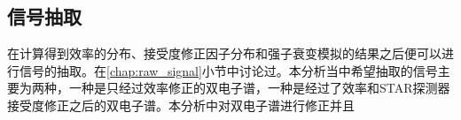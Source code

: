 \subsection{信号抽取}

在计算得到效率的分布、接受度修正因子分布和强子衰变模拟的结果之后便可以进行信号的抽取。在\ref{chap:raw_signal}小节中讨论过。本分析当中希望抽取的信号主要为两种，一种是只经过效率修正的双电子谱，一种是经过了效率和STAR探测器接受度修正之后的双电子谱。本分析中对双电子谱进行修正并且
